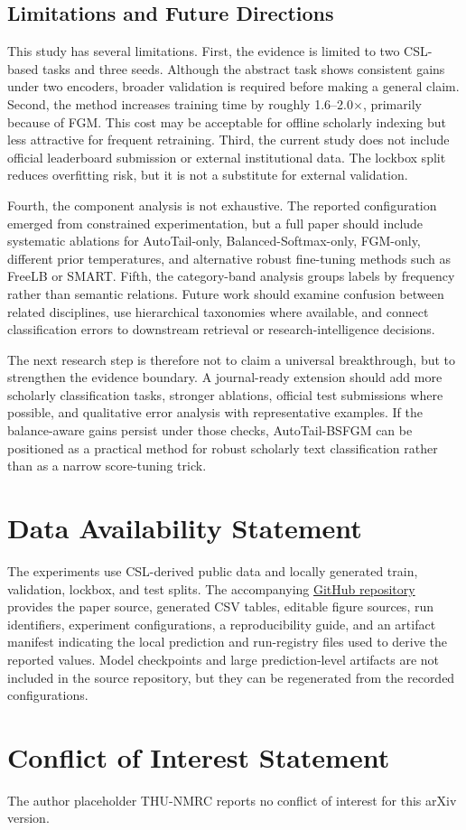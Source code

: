 \documentclass[10pt]{article}
\begin{document}
\subsection{Limitations and Future Directions}

This study has several limitations. First, the evidence is limited to two CSL-based tasks and three seeds. Although the abstract task shows consistent gains under two encoders, broader validation is required before making a general claim. Second, the method increases training time by roughly 1.6--2.0$\times$, primarily because of FGM. This cost may be acceptable for offline scholarly indexing but less attractive for frequent retraining. Third, the current study does not include official leaderboard submission or external institutional data. The lockbox split reduces overfitting risk, but it is not a substitute for external validation.

Fourth, the component analysis is not exhaustive. The reported configuration emerged from constrained experimentation, but a full paper should include systematic ablations for AutoTail-only, Balanced-Softmax-only, FGM-only, different prior temperatures, and alternative robust fine-tuning methods such as FreeLB or SMART. Fifth, the category-band analysis groups labels by frequency rather than semantic relations. Future work should examine confusion between related disciplines, use hierarchical taxonomies where available, and connect classification errors to downstream retrieval or research-intelligence decisions.

The next research step is therefore not to claim a universal breakthrough, but to strengthen the evidence boundary. A journal-ready extension should add more scholarly classification tasks, stronger ablations, official test submissions where possible, and qualitative error analysis with representative examples. If the balance-aware gains persist under those checks, AutoTail-BSFGM can be positioned as a practical method for robust scholarly text classification rather than as a narrow score-tuning trick.

\section*{Data Availability Statement}

The experiments use CSL-derived public data and locally generated train, validation, lockbox, and test splits. The accompanying \href{https://github.com/thu-nmrc/autotail-bsfgm-scholarly-classification}{GitHub repository} provides the paper source, generated CSV tables, editable figure sources, run identifiers, experiment configurations, a reproducibility guide, and an artifact manifest indicating the local prediction and run-registry files used to derive the reported values. Model checkpoints and large prediction-level artifacts are not included in the source repository, but they can be regenerated from the recorded configurations.

\section*{Conflict of Interest Statement}

The author placeholder THU-NMRC reports no conflict of interest for this arXiv version.



\end{document}
